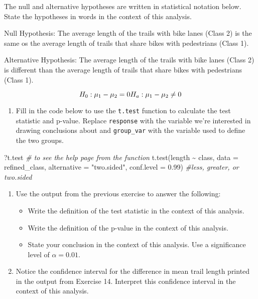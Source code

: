 \documentclass[
]{article}
\newenvironment{Shaded}{\begin{snugshade}}{\end{snugshade}}
\newcommand{\AttributeTok}[1]{\textcolor[rgb]{0.77,0.63,0.00}{#1}}
\newcommand{\CommentTok}[1]{\textcolor[rgb]{0.56,0.35,0.01}{\textit{#1}}}
\newcommand{\FloatTok}[1]{\textcolor[rgb]{0.00,0.00,0.81}{#1}}
\newcommand{\FunctionTok}[1]{\textcolor[rgb]{0.00,0.00,0.00}{#1}}
\newcommand{\NormalTok}[1]{#1}
\newcommand{\SpecialCharTok}[1]{\textcolor[rgb]{0.00,0.00,0.00}{#1}}
\newcommand{\StringTok}[1]{\textcolor[rgb]{0.31,0.60,0.02}{#1}}
\providecommand{\tightlist}{%
  \setlength{\itemsep}{0pt}\setlength{\parskip}{0pt}}
\begin{document}
The null and alternative hypotheses are written in statistical notation
below. State the hypotheses in words in the context of this analysis.

Null Hypothesis: The average length of the trails with bike lanes (Class
2) is the same os the average length of trails that share bikes with
pedestrians (Class 1).

Alternative Hypothesis: The average length of the trails with bike lanes
(Class 2) is different than the average length of trails that share
bikes with pedestrians (Class 1).

\[H_0: \mu_1 - \mu_2 = 0 \\
H_a: \mu_1 - \mu_2 \neq 0\]

\begin{enumerate}
\def\labelenumi{\arabic{enumi}.}
\setcounter{enumi}{13}
\tightlist
\item
  Fill in the code below to use the \texttt{t.test} function to
  calculate the test statistic and p-value. Replace \texttt{response}
  with the variable we're interested in drawing conclusions about and
  \texttt{group\_var} with the variable used to define the two groups.
\end{enumerate}

\begin{Shaded}
\begin{Highlighting}[]
\NormalTok{?t.test }\CommentTok{\# to see the help page from the function}
\FunctionTok{t.test}\NormalTok{(length }\SpecialCharTok{\textasciitilde{}}\NormalTok{ class, }\AttributeTok{data =}\NormalTok{ refined\_class, }
       \AttributeTok{alternative =} \StringTok{"two.sided"}\NormalTok{, }
       \AttributeTok{conf.level =} \FloatTok{0.99}\NormalTok{) }\CommentTok{\#less, greater, or two.sided}
\end{Highlighting}
\end{Shaded}

\begin{enumerate}
\def\labelenumi{\arabic{enumi}.}
\setcounter{enumi}{14}
\tightlist
\item
  Use the output from the previous exercise to answer the following:

  \begin{itemize}
  \tightlist
  \item
    Write the definition of the test statistic in the context of this
    analysis.
  \item
    Write the definition of the p-value in the context of this analysis.
  \item
    State your conclusion in the context of this analysis. Use a
    significance level of \(\alpha = 0.01\).
  \end{itemize}
\item
  Notice the confidence interval for the difference in mean trail length
  printed in the output from Exercise 14. Interpret this confidence
  interval in the context of this analysis.
\end{enumerate}
\end{document}
